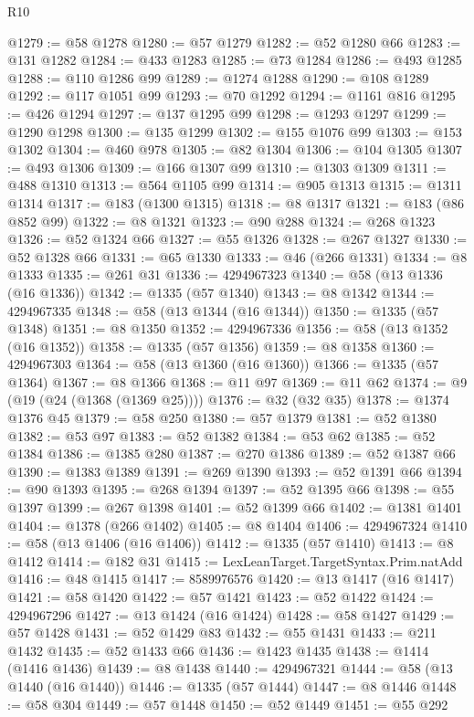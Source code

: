 \begin{lexlean}{R10}
\begin{coremodule}
@1279 := @58 @1278
@1280 := @57 @1279
@1282 := @52 @1280 @66
@1283 := @131 @1282
@1284 := @433 @1283
@1285 := @73 @1284
@1286 := @493 @1285
@1288 := @110 @1286 @99
@1289 := @1274 @1288
@1290 := @108 @1289
@1292 := @117 @1051 @99
@1293 := @70 @1292
@1294 := @1161 @816
@1295 := @426 @1294
@1297 := @137 @1295 @99
@1298 := @1293 @1297
@1299 := @1290 @1298
@1300 := @135 @1299
@1302 := @155 @1076 @99
@1303 := @153 @1302
@1304 := @460 @978
@1305 := @82 @1304
@1306 := @104 @1305
@1307 := @493 @1306
@1309 := @166 @1307 @99
@1310 := @1303 @1309
@1311 := @488 @1310
@1313 := @564 @1105 @99
@1314 := @905 @1313
@1315 := @1311 @1314
@1317 := @183 (@1300 @1315)
@1318 := @8 @1317
@1321 := @183 (@86 @852 @99)
@1322 := @8 @1321
@1323 := @90 @288
@1324 := @268 @1323
@1326 := @52 @1324 @66
@1327 := @55 @1326
@1328 := @267 @1327
@1330 := @52 @1328 @66
@1331 := @65 @1330
@1333 := @46 (@266 @1331)
@1334 := @8 @1333
@1335 := @261 @31
@1336 := 4294967323
@1340 := @58 (@13 @1336 (@16 @1336))
@1342 := @1335 (@57 @1340)
@1343 := @8 @1342
@1344 := 4294967335
@1348 := @58 (@13 @1344 (@16 @1344))
@1350 := @1335 (@57 @1348)
@1351 := @8 @1350
@1352 := 4294967336
@1356 := @58 (@13 @1352 (@16 @1352))
@1358 := @1335 (@57 @1356)
@1359 := @8 @1358
@1360 := 4294967303
@1364 := @58 (@13 @1360 (@16 @1360))
@1366 := @1335 (@57 @1364)
@1367 := @8 @1366
@1368 := @11 @97
@1369 := @11 @62
@1374 := @9 (@19 (@24 (@1368 (@1369 @25))))
@1376 := @32 (@32 @35)
@1378 := @1374 @1376 @45
@1379 := @58 @250
@1380 := @57 @1379
@1381 := @52 @1380
@1382 := @53 @97
@1383 := @52 @1382
@1384 := @53 @62
@1385 := @52 @1384
@1386 := @1385 @280
@1387 := @270 @1386
@1389 := @52 @1387 @66
@1390 := @1383 @1389
@1391 := @269 @1390
@1393 := @52 @1391 @66
@1394 := @90 @1393
@1395 := @268 @1394
@1397 := @52 @1395 @66
@1398 := @55 @1397
@1399 := @267 @1398
@1401 := @52 @1399 @66
@1402 := @1381 @1401
@1404 := @1378 (@266 @1402)
@1405 := @8 @1404
@1406 := 4294967324
@1410 := @58 (@13 @1406 (@16 @1406))
@1412 := @1335 (@57 @1410)
@1413 := @8 @1412
@1414 := @182 @31
@1415 := LexLeanTarget.TargetSyntax.Prim.natAdd
@1416 := @48 @1415
@1417 := 8589976576
@1420 := @13 @1417 (@16 @1417)
@1421 := @58 @1420
@1422 := @57 @1421
@1423 := @52 @1422
@1424 := 4294967296
@1427 := @13 @1424 (@16 @1424)
@1428 := @58 @1427
@1429 := @57 @1428
@1431 := @52 @1429 @83
@1432 := @55 @1431
@1433 := @211 @1432
@1435 := @52 @1433 @66
@1436 := @1423 @1435
@1438 := @1414 (@1416 @1436)
@1439 := @8 @1438
@1440 := 4294967321
@1444 := @58 (@13 @1440 (@16 @1440))
@1446 := @1335 (@57 @1444)
@1447 := @8 @1446
@1448 := @58 @304
@1449 := @57 @1448
@1450 := @52 @1449
@1451 := @55 @292

\end{coremodule}
\end{lexlean}

